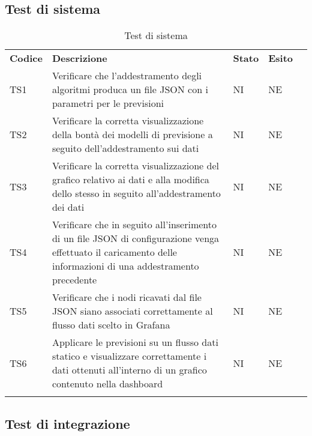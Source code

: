 
\subsection{Test di sistema}

\begin{longtable} {
		>{}p{15mm} 
		>{}p{79.5mm}
		>{}p{15mm} 
		>{}p{15mm}
		>{}p{0mm}}
	\rowcolor{gray!50}
	\textbf{Codice} & \textbf{Descrizione} & \textbf{Stato} & \textbf{Esito} &\TBstrut \\
	TS1 & Verificare che l'addestramento degli algoritmi produca un file JSON con i parametri per le previsioni & NI & NE  &\TBstrut \\ [2mm]
	TS2 & Verificare la corretta visualizzazione della bontà dei modelli di previsione a seguito dell'addestramento sui dati & NI & NE  &\TBstrut \\ [2mm]
	TS3 & Verificare la corretta visualizzazione del grafico relativo ai dati e alla modifica dello stesso in seguito all'addestramento dei dati & NI & NE  &\TBstrut \\ [2mm]
	TS4 & Verificare che in seguito all'inserimento di un file JSON di configurazione venga effettuato il caricamento delle informazioni di una addestramento precedente & NI & NE  &\TBstrut \\ [2mm]
	TS5 & Verificare che i nodi ricavati dal file JSON siano associati correttamente al flusso dati scelto in Grafana\glo & NI & NE &\TBstrut \\ [2mm]
	TS6 & Applicare le previsioni su un flusso dati statico e visualizzare correttamente i dati ottenuti all'interno di un grafico contenuto nella dashboard\glo & NI & NE  &\TBstrut \\ [2mm]
	\rowcolor{white}
	\caption{Test di sistema}
\end{longtable}


\subsection{Test di integrazione}


